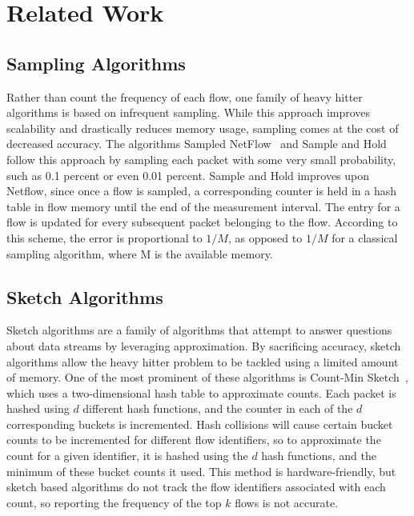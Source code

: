 \section{Related Work}
\label{sec:related}

\subsection{Sampling Algorithms}
Rather than count the frequency of each flow, one family of heavy hitter algorithms is based on infrequent sampling. While this approach improves scalability and drastically reduces memory usage, sampling comes at the cost of decreased accuracy. The algorithms Sampled NetFlow~\cite{netflow} and Sample and Hold~\cite{samplehold} follow this approach by sampling each packet with some very small probability, such as 0.1 percent or even 0.01 percent. Sample and Hold improves upon Netflow, since once a flow is sampled, a corresponding counter is held in a hash table in flow memory until the end of the measurement interval. The entry for a flow is updated for every subsequent packet belonging to the flow. According to this scheme, the error is proportional to $1/M$, as opposed to $1/M$ for a classical sampling algorithm, where M is the available memory. 
\subsection{Sketch Algorithms}
Sketch algorithms are a family of algorithms that attempt to answer questions about data streams by leveraging approximation. By sacrificing accuracy, sketch algorithms allow the heavy hitter problem to be tackled using a limited amount of memory. One of the most prominent of these algorithms is Count-Min Sketch~\cite{countmin}, which uses a two-dimensional hash table to approximate counts. Each packet is hashed using $d$ different hash functions, and the counter in each of the $d$ corresponding buckets is incremented. Hash collisions will cause certain bucket counts to be incremented for different flow identifiers, so to approximate the count for a given identifier, it is hashed using the $d$ hash functions, and the minimum of these bucket counts it used. This method is hardware-friendly, but sketch based algorithms do not track the flow identifiers associated with each count, so reporting the frequency of the top $k$ flows is not accurate.
